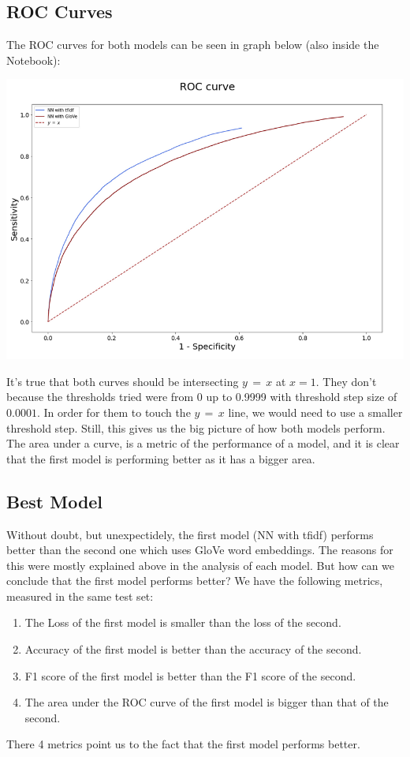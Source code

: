 \documentclass[12pt]{report}
\begin{document}
\clearpage
\subsection*{ROC Curves}
The ROC curves for both models can be seen in graph below (also inside the Notebook):
\smallskip

\hspace*{-0.5cm}
\includegraphics[scale=0.46]{images/roc.png}
\smallskip

It's true that both curves should be intersecting $y\,=\,x$ at $x=1$. They don't because
the thresholds tried were from 0 up to 0.9999 with threshold step size of $0.0001$. In
order for them to touch the $y\,=\,x$ line, we would need to use a smaller threshold step.
Still, this gives us the big picture of how both models perform. The area under a curve,
is a metric of the performance of a model, and it is clear that the first model is
performing better as it has a bigger area.

\subsection*{Best Model}
Without doubt, but unexpectidely, the first model (NN with tfidf) performs better than
the second one which uses GloVe word embeddings. The reasons for this were mostly explained
above in the analysis of each model. But how can we conclude that the first model performs
better? We have the following metrics, measured in the same test set:
\begin{enumerate}
    \item The Loss of the first model is smaller than the loss of the second.
    \item Accuracy of the first model is better than the accuracy of the second.
    \item F1 score of the first model is better than the F1 score of the second.
    \item The area under the ROC curve of the first model is bigger than that of
        the second.
\end{enumerate}
There 4 metrics point us to the fact that the first model performs better.
\end{document}
